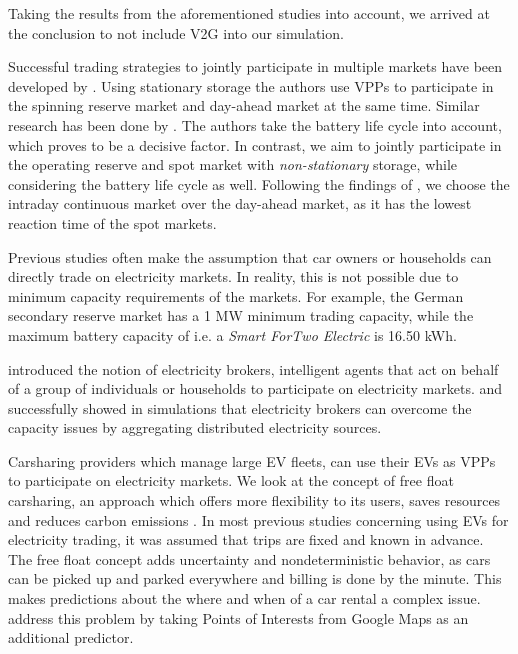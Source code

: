 \documentclass[12pt, article]{article}
\begin{document}
Taking the results from the aforementioned studies into account, we arrived at
the conclusion to not include V2G into our simulation.

Successful trading strategies to jointly participate in multiple markets have
been developed by \textcite{mashhour11_biddin_strat_virtual_power_plant_2}. Using
stationary storage the authors use VPPs to participate in the spinning reserve
market and day-ahead market at the same time. Similar research has been done by
\textcite{he16_optim_biddin_strat_batter_storag}. The authors take the battery
life cycle into account, which proves to be a decisive factor. In contrast, we
aim to jointly participate in the operating reserve and spot market with
\emph{non-stationary} storage, while considering the battery life cycle as well.
Following the findings of
\textcite{tomic07_using_fleet_elect_drive_vehic_grid_suppor}, we choose the
intraday continuous market over the day-ahead market, as it has the lowest
reaction time of the spot markets.


Previous studies often make the assumption that car owners or households can
directly trade on electricity markets. In reality, this is not possible due to
minimum capacity requirements of the markets. For example, the German secondary
reserve market has a 1 MW minimum trading capacity, while the maximum battery
capacity of i.e. a \emph{Smart ForTwo Electric} is 16.50 kWh.

\textcite{ketter13_power_tac} introduced the notion of electricity brokers,
intelligent agents that act on behalf of a group of individuals or households to
participate on electricity markets.
\textcite{brandt17_evaluat_busin_model_vehic_grid_integ} and
\textcite{kahlen14_balan_with_elect_vehic} successfully showed in simulations that
electricity brokers can overcome the capacity issues by aggregating distributed
electricity sources.

Carsharing providers which manage large EV fleets, can use their EVs as VPPs to
participate on electricity markets. We look at the concept of free float
carsharing, an approach which offers more flexibility to its users, saves
resources and reduces carbon emissions
\parencite{firnkorn15_free_float_elect_carsh_fleet_smart_cities}. In most previous
studies concerning using EVs for electricity trading, it was assumed that trips
are fixed and known in advance. The free float concept adds uncertainty and
nondeterministic behavior, as cars can be picked up and parked everywhere and
billing is done by the minute. This makes predictions about the where and when
of a car rental a complex issue. \textcite{wagner16_in_free_float} address this
problem by taking Points of Interests from Google Maps as an additional
predictor.
\end{document}
